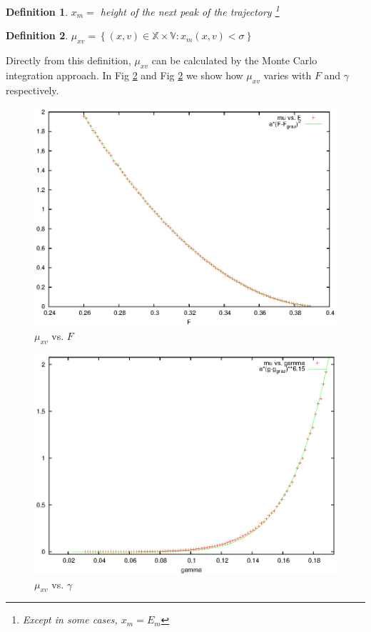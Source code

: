 \documentclass{book}
\renewcommand{\(}{\begin{columns}}
\renewcommand{\)}{\end{columns}}
\newcommand{\<}[1]{\begin{column}{#1}}
\renewcommand{\>}{\end{column}}
\newtheorem{definition}{Definition}[section]
\begin{document}
\begin{definition}
$x_m= $ height of the next peak of the trajectory  \footnote{Except in 
some cases, $x_m=E_m$}
\end{definition}

\begin{definition}
\label{def-mu}
$\mu_{xv}=\left\{(x,v)\in\mathbb{X\times V}:x_m(x,v)<\sigma\right\}$
\end{definition}

Directly from this definition, $\mu_{xv}$ can be calculated by the Monte Carlo 
integration approach.  In Fig \ref{fig-scang} and Fig \ref{fig-scang} we 
show how $\mu_{xv}$ varies with $F$ and $\gamma$ respectively.  

\begin{figure}
\begin{center}
\caption{$\mu_{xv}$ vs.  $F$}
\label{fig-scanf}
\includegraphics[width=0.8\columnwidth]{scanf}
\end{center}
\end{figure}



\begin{figure}
\begin{center}
\caption{$\mu_{xv}$ vs.  $\gamma$}
\label{fig-scang}
\includegraphics[width=0.8\columnwidth]{scang}
\end{center}
\end{figure}
\end{document}
